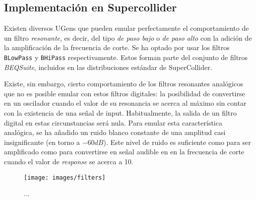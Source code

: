 \begin{comment}
\begin{table}
	\begin{center}
		\begin{tabular}{ l|lll }
									&\textit{High/Low pass}	& \textit{Resonator}	& \textit{Osc}\\
			\hline
			\textit{Frequency}		 	& bucle DAR 		 	& AD(0)R			& bucle DADSR\\
			\textit{Response}		 	& bucle DAR 		 	& AD(0)R			& bucle DADSR\\
		
		\end{tabular}
		\caption[...]{...}
		\label{table:filters}
	\end{center}
\end{table}
\end{comment}


\subsection{Implementación en Supercollider}

Existen diversos UGens que pueden emular perfectamente el comportamiento de un filtro \textit{resonante}, es decir, del tipo \textit{de paso bajo} o \textit{de paso alto} con la adición de la amplificación de la frecuencia de corte. Se ha optado por usar los filtros \texttt{BLowPass} y \texttt{BHiPass} respectivamente. Estos forman parte del conjunto de filtros \textit{BEQSuite}, incluidos en las distribuciones estándar de SuperCollider. 

Existe, sin embargo, cierto comportamiento de los filtros resonantes analógicos que no es posible emular con estos filtros digitales: la posibilidad de convertirse en un oscilador cuando el valor de su resonancia se acerca al máximo sin contar con la existencia de una señal de input. Habitualmente, la salida de un filtro digital en estas circunstancias será nula. Para emular esta característica analógica, se ha añadido un ruido blanco constante de una amplitud casi insignificante (en torno a $-60 dB$). Este nivel de ruido es suficiente como para ser amplificado como para convertirse en señal audible en en la frecuencia de corte cuando el valor de \textit{response} se acerca a 10.

\begin{figure}
	\centering
	\texttt{[image: images/filters]}
	\caption{...}
	\label{fig:filters}
\end{figure}


